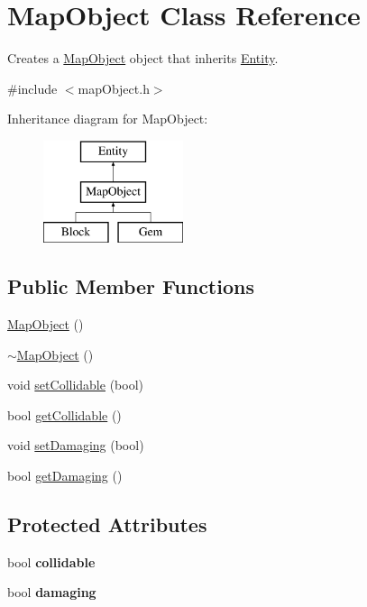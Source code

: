 \hypertarget{class_map_object}{\section{Map\+Object Class Reference}
\label{class_map_object}
}


Creates a \hyperlink{class_map_object}{Map\+Object} object that inherits \hyperlink{class_entity}{Entity}.  




{\ttfamily \#include $<$map\+Object.\+h$>$}

Inheritance diagram for Map\+Object\+:\begin{figure}[H]
\begin{center}
\leavevmode
\includegraphics[height=3.000000cm]{class_map_object}
\end{center}
\end{figure}
\subsection*{Public Member Functions}
\begin{DoxyCompactItemize}
\item 
\hyperlink{class_map_object_a568754515cc72ce0861d30c3040d26d2}{Map\+Object} ()
\item 
\hyperlink{class_map_object_aa601344267a49df197e841fcbd732209}{$\sim$\+Map\+Object} ()
\item 
void \hyperlink{class_map_object_afc35a1271fdb83198e239a548b26337e}{set\+Collidable} (bool)
\item 
bool \hyperlink{class_map_object_a5c940048e408308c71b57a78444d155d}{get\+Collidable} ()
\item 
void \hyperlink{class_map_object_abcf8499f40944338e194abcbd3294852}{set\+Damaging} (bool)
\item 
bool \hyperlink{class_map_object_acaa0fff07bd2550c1f023ca90e2a4b04}{get\+Damaging} ()
\end{DoxyCompactItemize}
\subsection*{Protected Attributes}
\begin{DoxyCompactItemize}
\item 
\hypertarget{class_map_object_a1d900ea8b9825881d5116711569b5e11}{bool {\bfseries collidable}}\label{class_map_object_a1d900ea8b9825881d5116711569b5e11}

\item 
\hypertarget{class_map_object_aa7f81dc2db7b5cdf0267717dee175d62}{bool {\bfseries damaging}}\label{class_map_object_aa7f81dc2db7b5cdf0267717dee175d62}

\end{DoxyCompactItemize}


